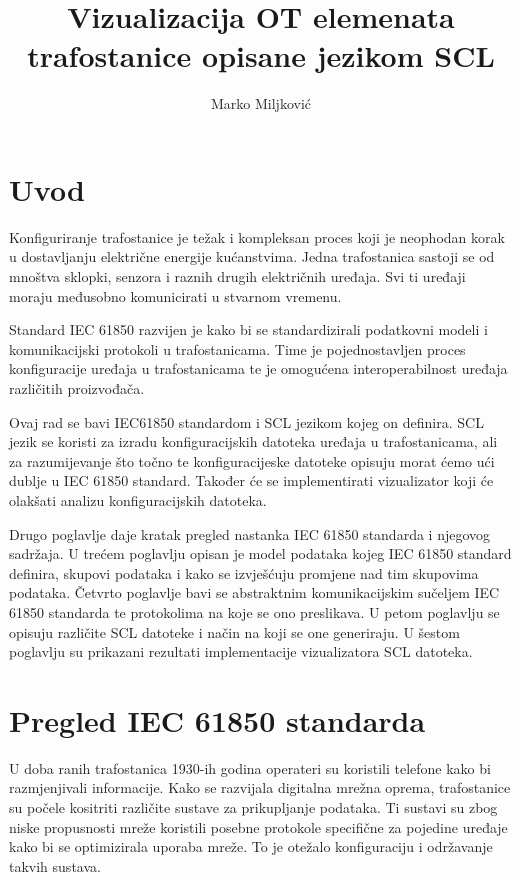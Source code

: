 \documentclass[times, utf8, zavrsni]{fer}
\begin{document}
\title{Vizualizacija OT elemenata trafostanice opisane jezikom SCL}
\author{Marko Miljković}

\maketitle



\zahvala{}

\tableofcontents

\chapter{Uvod}
Konfiguriranje trafostanice je težak i kompleksan proces koji je neophodan korak u dostavljanju električne energije kućanstvima. Jedna trafostanica sastoji se od mnoštva sklopki, senzora i raznih drugih električnih uređaja. Svi ti uređaji moraju međusobno komunicirati u stvarnom vremenu.

Standard IEC 61850 razvijen je kako bi se standardizirali podatkovni modeli i komunikacijski protokoli u trafostanicama. Time je pojednostavljen proces konfiguracije uređaja u trafostanicama te je omogućena interoperabilnost uređaja različitih proizvođača.

Ovaj rad se bavi IEC61850 standardom i SCL jezikom kojeg on definira. SCL jezik se koristi za izradu konfiguracijskih datoteka uređaja u trafostanicama, ali za razumijevanje što točno te konfiguracijeske datoteke opisuju morat ćemo ući dublje u IEC 61850 standard. Također će se implementirati vizualizator koji će olakšati analizu konfiguracijskih datoteka.

\bigskip
Drugo poglavlje daje kratak pregled nastanka IEC 61850 standarda i njegovog sadržaja. U trećem poglavlju opisan je model podataka kojeg IEC 61850 standard definira, skupovi podataka i kako se izvješćuju promjene nad tim skupovima podataka. Četvrto poglavlje bavi se abstraktnim komunikacijskim sučeljem IEC 61850 standarda te protokolima na koje se ono preslikava. U petom poglavlju se opisuju različite SCL datoteke i način na koji se one generiraju. U šestom poglavlju su prikazani rezultati implementacije vizualizatora SCL datoteka.

\chapter{Pregled IEC 61850 standarda}
U doba ranih trafostanica 1930-ih godina operateri su koristili telefone kako bi razmjenjivali informacije. Kako se razvijala digitalna mrežna oprema, trafostanice su počele kositriti različite sustave za prikupljanje podataka. Ti sustavi su zbog niske propusnosti mreže koristili posebne protokole specifične za pojedine uređaje kako bi se optimizirala uporaba mreže. To je otežalo konfiguraciju i održavanje takvih sustava.
\end{document}
